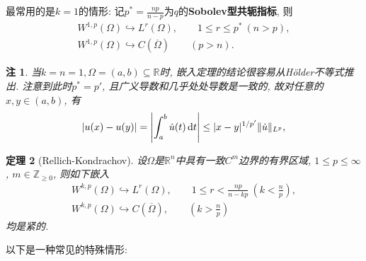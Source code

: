 \documentclass[12pt,a4paper]{article}
\newtheorem{theorem}{定理}[section]
\newtheorem{remark}[theorem]{注}
\begin{document}
最常用的是$k = 1$的情形: 记$p^* = \frac{np}{n - p}$为$q$的\textbf{Sobolev型共轭指标}, 则 
\begin{gather*}
    W^{1, p}(\Omega) \hookrightarrow L^r(\Omega), \qquad 1 \leq r \leq p^*\ (n > p), \\ 
    W^{1, p}(\Omega) \hookrightarrow C(\overline{\Omega}) \qquad (p > n).
\end{gather*}

\begin{remark}
    当$k = n = 1, \Omega = (a, b) \subseteq \mathbb{R}$时, 嵌入定理的结论很容易从H\"older不等式推出.
    注意到此时$p^* = p'$, 且广义导数和几乎处处导数是一致的, 故对任意的$x, y \in (a, b)$, 有 
    \begin{equation*}
        |u(x) - u(y)| = \left|\int_a^b\dot u(t) \,{\rm d}t\right| \leq |x - y|^{1/p'}\Vert \dot u \Vert_{L^p},
    \end{equation*}
\end{remark}

\begin{theorem}[Rellich-Kondrachov]
    设$\Omega$是$\mathbb{R}^n$中具有一致$C^m$边界的有界区域, $1 \leq p \leq \infty$, $m \in \mathbb{Z}_{\geq 0}$, 则如下嵌入 
    \begin{gather*}
        W^{k, p}(\Omega) \hookrightarrow L^r(\Omega), \qquad 1 \leq r < \frac{np}{n - kp}\ \left(k < \frac{n}{p}\right), \\
        W^{k, p}(\Omega) \hookrightarrow C(\overline{\Omega}), \qquad \left(k > \frac{n}{p}\right)
    \end{gather*}
    均是紧的.
\end{theorem}

以下是一种常见的特殊情形:
\end{document}
